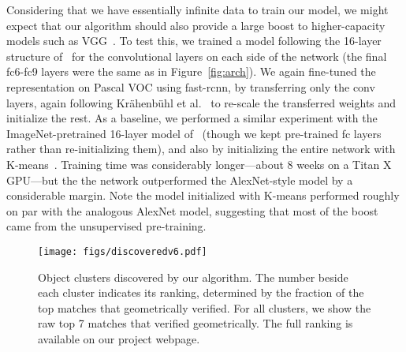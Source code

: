 \documentclass[10pt,twocolumn,letterpaper]{article}
\begin{document}
Considering that we have essentially infinite data to train our model, we might expect
that our algorithm should also provide a large boost to higher-capacity models such as 
VGG~\cite{Simonyan14c}.  To test this, we trained a model following the 16-layer
structure of~\cite{Simonyan14c} for the convolutional layers on each side of the network 
(the final fc6-fc9 layers were the same as in Figure~\ref{fig:arch}).  
We again
fine-tuned the representation on Pascal VOC using fast-rcnn, by transferring only the 
conv layers, again following Kr{\"a}henb{\"u}hl et al.~\cite{krahenbuhl2015data} to 
re-scale the transferred weights and
initialize the rest.  As a baseline, we performed a similar experiment with the ImageNet-pretrained
16-layer model of~\cite{Simonyan14c} (though we kept pre-trained fc layers
rather than re-initializing them), 
and also by initializing the entire network with
K-means~\cite{krahenbuhl2015data}.  Training time was considerably longer---about 8 weeks
on a Titan X GPU---but the the network outperformed the AlexNet-style model by a considerable
margin.  Note the model initialized with K-means performed roughly on par with the analogous
AlexNet model, suggesting that most of the boost came from the unsupervised pre-training.



\begin{figure*}
\begin{center}
   \texttt{[image: figs/discoveredv6.pdf]}
\end{center}
\vspace{-0.1in}
   \caption{Object clusters discovered by our algorithm.  The number beside each cluster indicates its ranking, determined by the fraction of the top matches that geometrically verified.  %
   For all clusters, we show the raw top 7 matches that verified geometrically.  
   The full ranking is available on our project webpage.}
   \vspace{-0.2in}
\label{fig:discovered}
\end{figure*}
\end{document}
